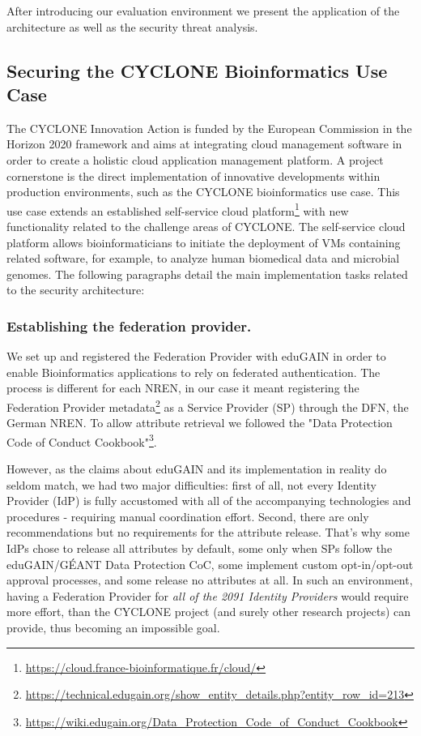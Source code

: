 \documentclass{llncs}
\begin{document}
After introducing our evaluation environment we present the application of the architecture as well as the security threat analysis.

\subsection{Securing the CYCLONE Bioinformatics Use Case}

The CYCLONE Innovation Action is funded by the European Commission in the Horizon 2020 framework and aims at integrating cloud management software in order to create a holistic cloud application management platform. A project cornerstone is the direct implementation of innovative developments within production environments, such as the CYCLONE bioinformatics use case. This use case extends an established self-service cloud platform\footnote{\url{https://cloud.france-bioinformatique.fr/cloud/}} with new functionality related to the challenge areas of CYCLONE. The self-service cloud platform allows bioinformaticians to initiate the deployment of VMs containing related software, for example, to analyze human biomedical data and microbial genomes. The following paragraphs detail the main implementation tasks related to the security architecture:

\subsubsection{Establishing the federation provider.}

We set up and registered the Federation Provider with eduGAIN in order to enable Bioinformatics applications to rely on federated authentication. The process is different for each NREN, in our case it meant registering the Federation Provider metadata\footnote{\url{https://technical.edugain.org/show\_entity\_details.php?entity\_row\_id=213}} as a Service Provider (SP) through the DFN, the German NREN. To allow attribute retrieval we followed the "Data Protection Code of Conduct Cookbook"\footnote{\url{https://wiki.edugain.org/Data\_Protection\_Code\_of\_Conduct\_Cookbook}}.

However, as the claims about eduGAIN and its implementation in reality do seldom match, we had two major difficulties: first of all, not every Identity Provider (IdP) is fully accustomed with all of the accompanying technologies and procedures - requiring manual coordination effort. Second, there are only recommendations but no requirements for the attribute release. That's why some IdPs chose to release all attributes by default, some only when SPs follow the eduGAIN/GÉANT Data Protection CoC, some implement custom opt-in/opt-out approval processes, and some release no attributes at all. In such an environment, having a Federation Provider for \textit{all of the 2091 Identity Providers} would require more effort, than the CYCLONE project (and surely other research projects) can provide, thus becoming an impossible goal.
\end{document}
